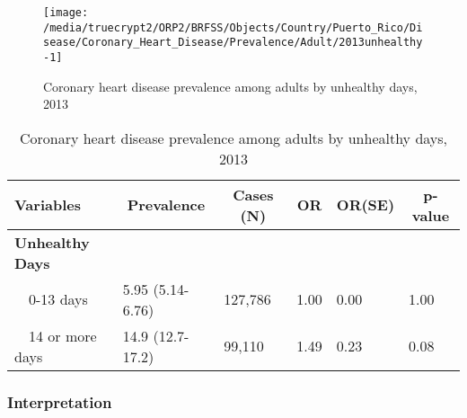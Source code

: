 \begin{figure}[H]
\caption{Coronary heart disease prevalence among adults by unhealthy days, 2013}
\label{fig:unhlthy.Coronary_Heart_Disease.2013}

\begin{knitrout}
\color{fgcolor}

{\centering \texttt{[image: /media/truecrypt2/ORP2/BRFSS/Objects/Country/Puerto\_Rico/Disease/Coronary\_Heart\_Disease/Prevalence/Adult/2013unhealthy-1]} 

}



\end{knitrout}
\end{figure}

\begin{table}[H]
\caption{Coronary heart disease prevalence among adults by unhealthy days, 2013\label{tab:unhlthy.Coronary_Heart_Disease.2013}} 
\begin{center}
\begin{tabular}{llllll}
\hline\hline
\multicolumn{1}{l}{Variables}&\multicolumn{1}{c}{Prevalence}&\multicolumn{1}{c}{Cases (N)}&\multicolumn{1}{c}{OR}&\multicolumn{1}{c}{OR(SE)}&\multicolumn{1}{c}{p-value}\tabularnewline
\hline
{\bfseries Unhealthy Days}&&&&&\tabularnewline
~~0-13 days&5.95 (5.14-6.76)&127,786&1.00&0.00&1.00\tabularnewline
~~14 or more days&14.9 (12.7-17.2)& 99,110&1.49&0.23&0.08\tabularnewline
\hline
\end{tabular}\end{center}

\end{table}

\newpage
\subsubsection{Interpretation}

